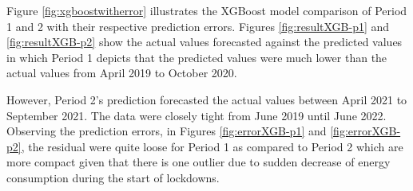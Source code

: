 \documentclass[runningheads]{llncs}
\begin{document}
Figure \ref{fig:xgboostwitherror} illustrates the XGBoost model comparison of Period 1 and 2 with their respective prediction errors. Figures \ref{fig:resultXGB-p1} and \ref{fig:resultXGB-p2} show the actual values forecasted against the predicted values in which Period 1 depicts that the predicted values were much lower than the actual values from April 2019 to October 2020. 

However, Period 2's prediction forecasted the actual values between April 2021 to September 2021. The data were closely tight from June 2019 until June 2022. Observing the prediction errors, in Figures \ref{fig:errorXGB-p1} and \ref{fig:errorXGB-p2}, the residual were quite loose for Period 1 as compared to Period 2 which are more compact given that there is one outlier due to sudden decrease of energy consumption during the start of lockdowns.  
\end{document}

